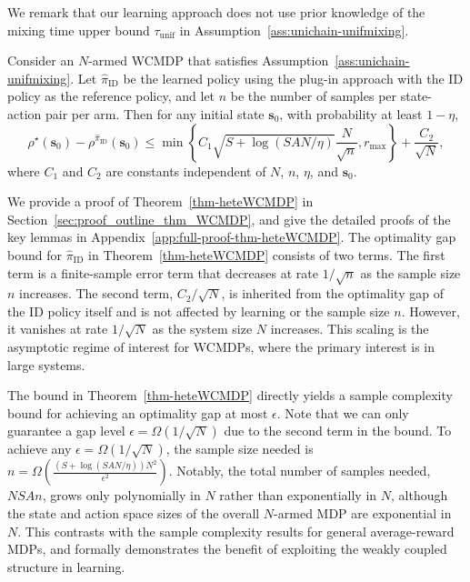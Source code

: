 \documentclass[mnsc,nonblindrev]{informs3}
\newcommand{\pihid}{\widehat{\pi}_{\mathrm{ID}}}
\newcommand{\tmix}{\tau_{\mathrm{unif}}}
\newcommand{\bms}{\bm{s}}
\begin{document}
We remark that our learning approach does not use prior knowledge of the mixing time upper bound \(\tmix\) in Assumption~\ref{ass:unichain-unifmixing}.

\begin{theorem}\label{thm-heteWCMDP}
Consider an $N$-armed WCMDP that satisfies Assumption~\ref{ass:unichain-unifmixing}.
Let $\pihid$ be the learned policy using the plug-in approach with the ID policy as the reference policy, and let $n$ be the number of samples per state-action pair per arm.
Then for any initial state $\bms_0$, with probability at least $1-\eta$, 
\[
\rho^{\star}(\bms_0) - \rho^{\pihid}(\bms_0) 
    \le \min\left\{C_1 \sqrt{S + \log (SAN/\eta)}
    \frac{N}{\sqrt{n}},r_{\max}\right\}+\frac{C_2}{\sqrt{N}},
\]
where $C_1$ and $C_2$ are constants independent of $N$, $n$, $\eta$, and $\bms_0$.
\end{theorem}

We provide a proof of Theorem~\ref{thm-heteWCMDP} in Section~\ref{sec:proof_outline_thm_WCMDP}, and give the detailed proofs of the key lemmas in Appendix~\ref{app:full-proof-thm-heteWCMDP}.
The optimality gap bound for $\pihid$ in Theorem~\ref{thm-heteWCMDP} consists of two terms.
The first term is a finite-sample error term that decreases at rate $1/{\sqrt{n}}$ as the sample size $n$ increases.
The second term, $C_2/{\sqrt{N}}$, is inherited from the optimality gap of the ID policy itself and is not affected by learning or the sample size $n$.
However, it vanishes at rate $1/{\sqrt{N}}$ as the system size $N$ increases.
This scaling is the asymptotic regime of interest for WCMDPs, where the primary interest is in large systems.

The bound in Theorem~\ref{thm-heteWCMDP} directly yields a sample complexity bound for achieving an optimality gap at most $\epsilon$.
Note that we can only guarantee a gap level $\epsilon=\Omega(1/\sqrt{N})$ due to the second term in the bound.
To achieve any $\epsilon=\Omega(1/\sqrt{N})$, the sample size needed is $n=\Omega\left(\frac{(S + \log (SAN/\eta))N^2}{\epsilon^2}\right)$.
Notably, the total number of samples needed, $NSAn$, grows only polynomially in $N$ rather than exponentially in $N$, although the state and action space sizes of the overall $N$-armed MDP are exponential in $N$.
This contrasts with the sample complexity results for general average-reward MDPs, and formally demonstrates the benefit of exploiting the weakly coupled structure in learning.
\end{document}
